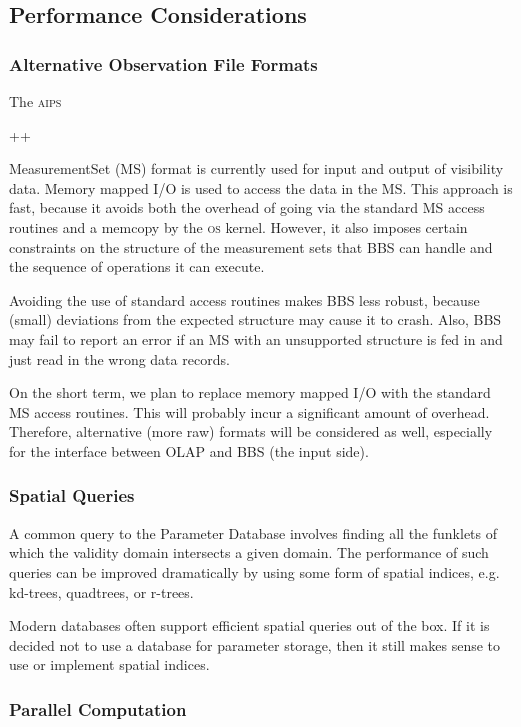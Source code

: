 \documentclass[10pt]{lofar}
\newcommand{\aips}{\textsc{aips}\begin{footnotesize}++\end{footnotesize}\xspace}
\begin{document}
\subsection{Performance Considerations}
\label{subsec:performance-considerations}

\subsubsection{Alternative Observation File Formats}
\label{subsubsec:performance-file-formats}

The \aips MeasurementSet (MS) format \cite{aips++note229} is currently used for
input and output of visibility data. Memory mapped I/O is used to access the
data in the MS. This approach is fast, because it avoids both the overhead of
going via the standard MS access routines and a memcopy by the \textsc{os}
kernel. However, it also imposes certain constraints on the structure of the
measurement sets that BBS can handle and the sequence of operations it can
execute.

Avoiding the use of standard access routines makes BBS less robust, because
(small) deviations from the expected structure may cause it to crash. Also, BBS
may fail to report an error if an MS with an unsupported structure is fed in and
just read in the wrong data records.

On the short term, we plan to replace memory mapped I/O with the standard MS
access routines. This will probably incur a significant amount of overhead.
Therefore, alternative (more raw) formats will be considered as well, especially
for the interface between OLAP and BBS (the input side).

\subsubsection{Spatial Queries}
\label{subsubsec:performance-spatial-queries}

A common query to the Parameter Database involves finding all the funklets of
which the validity domain intersects a given domain. The performance of such
queries can be improved dramatically by using some form of spatial indices, e.g.
kd-trees, quadtrees, or r-trees.

Modern databases often support efficient spatial queries out of the box. If it
is decided not to use a database for parameter storage, then it still makes
sense to use or implement spatial indices. 

\subsubsection{Parallel Computation}
\label{subsubsec:performance-parallel-computation}
\end{document}
